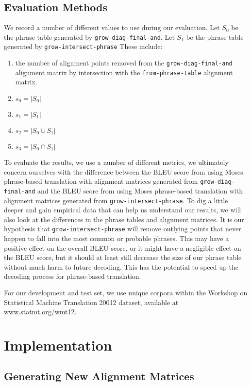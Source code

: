\documentclass[twocolumn]{article}
\newcommand{\originalAlign}{\texttt{grow-diag-final-and}}
\newcommand{\phraseAlign}{\texttt{from-phrase-table}}
\newcommand{\phraseIntersectAlign}{\texttt{grow-intersect-phrase}}
\newcommand{\wrapSingleSpacing}[1]{
  \singlespacing
  #1
  \onehalfspacing
}
\begin{document}
\subsection{Evaluation Methods}
We record a number of different values to use during our evaluation.
Let $S_0$ be the phrase table generated by \originalAlign{}.
Let $S_1$ be the phrase table generated by \phraseIntersectAlign{}
These include:
\wrapSingleSpacing{
\begin{enumerate}
  \item the number of alignment points removed from
    the \originalAlign{} alignment matrix
    by intersection with
    the \phraseAlign{} alignment matrix.
  \item $s_0 = |S_0|$
  \item $s_1 = |S_1|$
  \item $s_2 = |S_0 \cup S_1|$
  \item $s_3 = |S_0 \cap S_1|$
\end{enumerate}
}

To evaluate the results, we use a number of different metrics, we ultimately
concern ourselves with the difference between the BLEU score from using Moses
phrase-based translation with alignment matrices generated from \originalAlign{}
and the BLEU score from using Moses phrase-based translation with alignment
matrices generated from \phraseIntersectAlign{}.
To dig a little deeper and gain empirical data that can help us understand our
results, we will also look at the differences in the phrase tables and alignment
matrices. It is our hypothesis that \phraseIntersectAlign{} will remove outlying
points that never happen to fall into the most common or probable phrases. This
may have a positive effect on the overall BLEU score, or it might have a
negligible effect on the BLEU score, but it should at least still decrease the
size of our phrase table without much harm to future decoding. This has the
potential to speed up the decoding process for phrase-based translation.

For our development and test set, we use unique corpora within the Workshop on
Statistical Machine Translation 20012 dataset, available at
\href{http://www.statmt.org/wmt12/dev.tgz}
     {\underline{www.statmt.org/wmt12}}.


\section{Implementation}
\subsection{Generating New Alignment Matrices}
\end{document}
